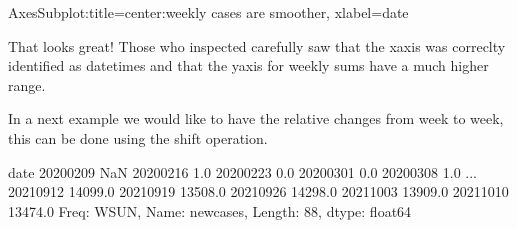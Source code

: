 \documentclass[letterpaper,10pt,english]{jupyterBook}
\begin{document}
\noindent{}

\begin{sphinxVerbatim}[commandchars=\\\{\}]
  \PYG{p}{[}\PYG{p}{]}
\end{sphinxVerbatim}

\begin{sphinxVerbatim}[commandchars=\\\{\}]
\PYGZlt{}AxesSubplot:title=\PYGZob{}\PYGZsq{}center\PYGZsq{}:\PYGZsq{}weekly cases are smoother\PYGZsq{}\PYGZcb{}, xlabel=\PYGZsq{}date\PYGZsq{}\PYGZgt{}
\end{sphinxVerbatim}

\noindent{}

\sphinxAtStartPar
That looks great! Those who inspected carefully saw that the x\sphinxhyphen{}axis was correclty identified as datetimes and that the y\sphinxhyphen{}axis for weekly sums have a much higher range.

\sphinxAtStartPar
In a next example we would like to have the relative changes from week to week, this can be done using the shift operation.

\begin{sphinxVerbatim}[commandchars=\\\{\}]
\end{sphinxVerbatim}

\begin{sphinxVerbatim}[commandchars=\\\{\}]
date
2020\PYGZhy{}02\PYGZhy{}09        NaN
2020\PYGZhy{}02\PYGZhy{}16        1.0
2020\PYGZhy{}02\PYGZhy{}23        0.0
2020\PYGZhy{}03\PYGZhy{}01        0.0
2020\PYGZhy{}03\PYGZhy{}08        1.0
               ...   
2021\PYGZhy{}09\PYGZhy{}12    14099.0
2021\PYGZhy{}09\PYGZhy{}19    13508.0
2021\PYGZhy{}09\PYGZhy{}26    14298.0
2021\PYGZhy{}10\PYGZhy{}03    13909.0
2021\PYGZhy{}10\PYGZhy{}10    13474.0
Freq: W\PYGZhy{}SUN, Name: new\PYGZus{}cases, Length: 88, dtype: float64
\end{sphinxVerbatim}
\end{document}
